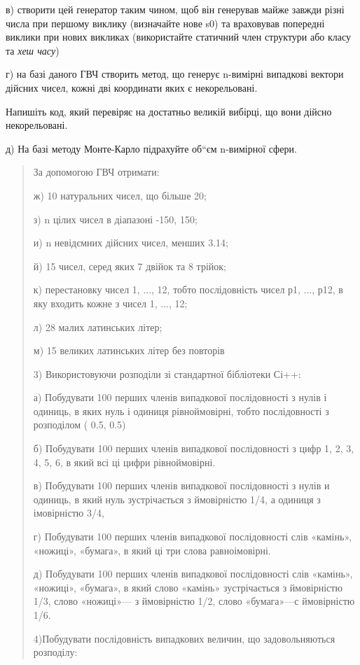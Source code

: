 \documentclass[]{article}
\begin{document}
в) створити цей генератор таким чином, щоб він генерував майже завжди
різні числа при першому виклику (визначайте нове s0) та враховував
попередні виклики при нових викликах (використайте статичний член
структури або класу та \emph{хеш часу})

г) на базі даного ГВЧ створить метод, що генерує n-вимірні випадкові
вектори дійсних чисел, кожні дві координати яких є некорельовані.

Напишіть код, який перевіряє на достатньо великій вибірці, що вони
дійсно некорельовані.

д) На базі методу Монте-Карло підрахуйте об``єм n-вимірної сфери.

\begin{quote}
За допомогою ГВЧ отримати:

ж) 10 натуральних чисел, що більше 20;

з) n цілих чисел в діапазоні -150, 150;

и) n не­відємних дійсних чисел, менших 3.14;

й) 15 чисел, серед яких 7 двійок та 8 трійок;

к) перестановку чисел 1, ..., 12, тобто послідовність чисел р1, ...,
р12, в яку входить кожне з чисел 1, ..., 12;

л) 28 малих латинських літер;

м) 15 великих латинських літер без повторів

3) Використовуючи розподіли зі стандартної бібліотеки Сі++:

а) Побудувати 100 перших членів випадкової послідовності з нулів і
одиниць, в яких нуль і одиниця рівноймовірні, тобто послідовності з
розподілом ( 0.5, 0.5)

б) Побудувати 100 перших членів випадкової послідовності з цифр 1, 2, 3,
4, 5, 6, в який всі ці цифри рівноймовірні.

в) Побудувати 100 перших членів випадкової послідовності з нулів и
одиниць, в який нуль зустрічається з ймовірністю 1/4, а одиниця з
імовірністю 3/4,

г) Побудувати 100 перших членів випадкової послідовності слів «камінь»,
«ножиці», «бумага», в який ці три слова равноімовірні.

д) Побудувати 100 перших членів випадкової послідовності слів «камінь»,
«ножиці», «бумага», в який слово «камінь» зустрічається з ймовірністю
1/3, слово «ножиці»--- з ймовірністю 1/2, слово «бумага»---с ймовірністю
1/6.

4)Побудувати послідовність випадкових величин, що задовольняються
розподілу:


\end{quote}
\end{document}
